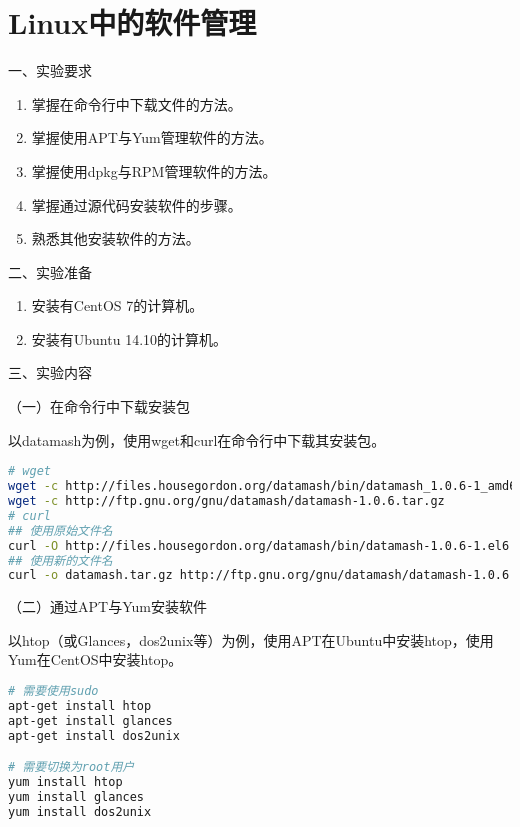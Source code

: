 \chapter{Linux中的软件管理}

\noindent
一、实验要求
\begin{enumerate}
  \item 掌握在命令行中下载文件的方法。
  \item 掌握使用APT与Yum管理软件的方法。
  \item 掌握使用dpkg与RPM管理软件的方法。
  \item 掌握通过源代码安装软件的步骤。
  \item 熟悉其他安装软件的方法。
\end{enumerate}

\vspace{0.2in}
\noindent
二、实验准备
\begin{enumerate}
  \item 安装有CentOS 7的计算机。
  \item 安装有Ubuntu 14.10的计算机。
\end{enumerate}

\vspace{0.2in}
\noindent
三、实验内容

\vspace{0.1in}
（一）在命令行中下载安装包

以datamash为例，使用wget和curl在命令行中下载其安装包。
\begin{lstlisting}[language=bash]
# wget
wget -c http://files.housegordon.org/datamash/bin/datamash_1.0.6-1_amd64.deb
wget -c http://ftp.gnu.org/gnu/datamash/datamash-1.0.6.tar.gz
# curl
## 使用原始文件名
curl -O http://files.housegordon.org/datamash/bin/datamash-1.0.6-1.el6.x86_64.rpm
## 使用新的文件名
curl -o datamash.tar.gz http://ftp.gnu.org/gnu/datamash/datamash-1.0.6.tar.gz
\end{lstlisting}

\vspace{0.1in}
（二）通过APT与Yum安装软件

以htop（或Glances，dos2unix等）为例，使用APT在Ubuntu中安装htop，使用Yum在CentOS中安装htop。
\begin{lstlisting}[language=bash]
# 需要使用sudo
apt-get install htop
apt-get install glances
apt-get install dos2unix

# 需要切换为root用户
yum install htop
yum install glances
yum install dos2unix
\end{lstlisting}

